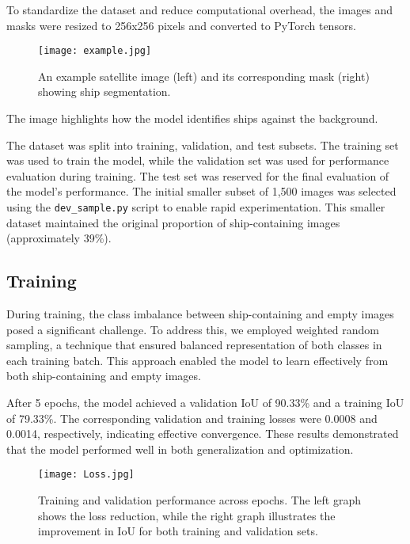 \documentclass{article}
\begin{document}
To standardize the dataset and reduce computational overhead, the images and masks were resized to 256x256 pixels and converted to PyTorch tensors.

\begin{figure}[h]
    \centering
    \texttt{[image: example.jpg]}
    \caption{An example satellite image (left) and its corresponding mask (right) showing ship segmentation.}
    \label{fig:image_and_mask}
\end{figure}

The image highlights how the model identifies ships against the background.

The dataset was split into training, validation, and test subsets. The training set was used to train the model, while the validation set was used for performance evaluation during training. The test set was reserved for the final evaluation of the model's performance. The initial smaller subset of 1,500 images was selected using the \texttt{dev\_sample.py} script to enable rapid experimentation. This smaller dataset maintained the original proportion of ship-containing images (approximately 39\%).

\subsection{Training}

During training, the class imbalance between ship-containing and empty images posed a significant challenge. To address this, we employed weighted random sampling, a technique that ensured balanced representation of both classes in each training batch. This approach enabled the model to learn effectively from both ship-containing and empty images.

After 5 epochs, the model achieved a validation IoU of 90.33\% and a training IoU of 79.33\%. The corresponding validation and training losses were 0.0008 and 0.0014, respectively, indicating effective convergence. These results demonstrated that the model performed well in both generalization and optimization.

\begin{figure}[h]
    \centering
    \texttt{[image: Loss.jpg]}
    \caption{Training and validation performance across epochs. The left graph shows the loss reduction, while the right graph illustrates the improvement in IoU for both training and validation sets.}
    \label{fig:loss_and_iou}
\end{figure}
\end{document}
